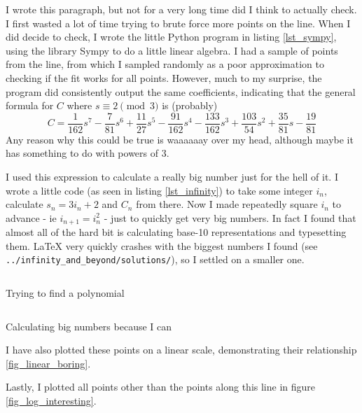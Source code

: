 I wrote this paragraph, but not for a very long time did I think to actually
check. I first wasted a lot of time trying to brute force more points on the
line. When I did decide to check, I wrote the little Python program in listing
\ref{lst_sympy}, using the library Sympy to do a little linear algebra. I had a
sample of points from the line, from which I sampled randomly as a poor
approximation to checking if the fit works for all points. However, much to my
surprise, the program did consistently output the same coefficients, indicating
that the general formula for \(C\) where \(s \equiv 2 \pmod 3\) is (probably)
\begin{equation*}
C = \frac{1}{162}s^7 - \frac{7}{81}s^6 + \frac{11}{27}s^5 - \frac{91}{162}s^4
    - \frac{133}{162}s^3 + \frac{103}{54}s^2 + \frac{35}{81}s - \frac{19}{81}
\end{equation*}
Any reason why this could be true is waaaaaay over my head, although maybe it
has something to do with powers of 3.

I used this expression to calculate a really big number just for the hell of it.
I wrote a little code (as seen in listing \ref{lst_infinity}) to take some
integer \(i_n\), calculate \(s_n = 3i_n + 2\) and \(C_n\) from there. Now I made
repeatedly square \(i_n\) to advance - ie \(i_{n + 1} = i_n^2\) - just to
quickly get very big numbers. In fact I found that almost all of the hard bit is
calculating base-10 representations and typesetting them. \LaTeX{} very quickly
crashes with the biggest numbers I found (see
\texttt{../infinity\_and\_beyond/solutions/}), so I settled on a smaller one.

\begin{longlisting}
\inputminted{python}{../investigate/solve.py}
\caption{Trying to find a polynomial}
\label{lst_sympy}
\end{longlisting}

\begin{longlisting}
\inputminted{python}{../infinity_and_beyond/buzz.py}
\caption{Calculating big numbers because I can}
\label{lst_infinity}
\end{longlisting}

I have also plotted these points on a linear scale, demonstrating their
relationship \ref{fig_linear_boring}.

Lastly, I plotted all points other than the points along this line in figure
\ref{fig_log_interesting}.

